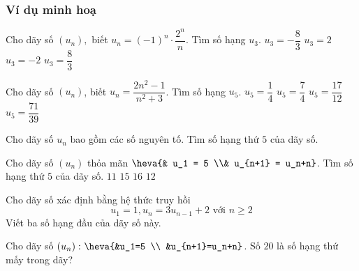 \subsubsection{Ví dụ minh hoạ}
\begin{vd}[NB]%
	Cho dãy số $(u_n),$ biết $u_n=(-1 )^n\cdot \dfrac{2^n}{n}$. Tìm số hạng $u_3$.
	\choice
	{\True $u_3=-\dfrac{8}{3}$}
	{$u_3=2$}
	{$u_3=-2$}
	{$u_3=\dfrac{8}{3}$}
\end{vd}
\begin{vd}[NB]%
	Cho dãy số $(u_n)$, biết $u_n=\dfrac{2n^2-1}{n^2+3}$. Tìm số hạng $u_5$.
	\choice
	{$u_5=\dfrac{1}{4}$}
	{\True $u_5=\dfrac{7}{4}$}
	{$u_5=\dfrac{17}{12}$}
	{$u_5=\dfrac{71}{39}$}
	
\end{vd}
\begin{vd}[NB]%
	Cho dãy số $u_n$ bao gồm các số nguyên tố. Tìm số hạng thứ $5$ của dãy số.
\end{vd}
\begin{vd}[NB]%
	Cho dãy số $(u_n) $ thỏa mãn $ \heva{& u_1 = 5 \\& u_{n+1} = u_n+n}$. Tìm số hạng thứ $5$ của dãy số.
	\choice
	{$ 11 $}
	{\True $ 15 $}
	{$ 16 $}
	{$ 12 $}
\end{vd}

\begin{vd}[TH]%
	Cho dãy số xác định bằng hệ thức truy hồi
	$$
	u_1=1, u_n=3 u_{n-1}+2 \text { với } n \geq 2
	$$
	Viết ba số hạng đầu của dãy số này.
\end{vd}

\begin{vd}[VD]%
	Cho dãy số $\left(u_n\right)\colon\heva{&u_1=5 \\ &u_{n+1}=u_n+n}$. Số $20$ là số hạng thứ mấy trong dãy?
\end{vd}

